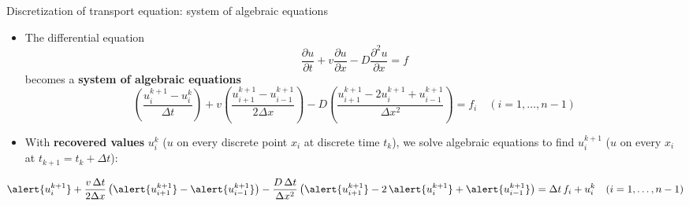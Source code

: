 \begin{frame}{Discretization of transport equation: system of algebraic equations}

\small
\begin{itemize}
\item The differential equation
\[
\frac{\partial u}{\partial t}+v\frac{\partial u}{\partial x}-D\frac{\partial^{2}u}{\partial x}=f
\]
%
\vskip 10pt
becomes a \textbf{system of algebraic equations}
\[
\left(\frac{u_{i}^{k+1}-u_{i}^{k}}{\Delta t}\right)+v\left(\frac{u_{i+1}^{k+1}-u_{i-1}^{k+1}}{2\Delta x}\right)-D\left(\frac{u_{i+1}^{k+1}-2u^{k+1}_{i}+u_{i-1}^{k+1}}{\Delta x^{2}}\right)=f_{i}\quad(i=1,\ldots,n-1)
\]
\item With {\bf recovered values} $u^k_i$ ($u$ on every \alert{discrete point} $x_{i}$ at \alert{discrete time} $t_{k}$), we solve algebraic equations to find \alert{$u^{k+1}_i$} ($u$ on every $x_{i}$ at ${t_{k+1}=t_{k}+\Delta t}$):\\[10pt]
\end{itemize}
%
\[
\alert{u_{i}^{k+1}}
+ \frac{v \, \Delta t}{2\Delta x} \left(\alert{u_{i+1}^{k+1}}-\alert{u_{i-1}^{k+1}}\right)
- \frac{D \, \Delta t}{\Delta x^{2}} \left(\alert{u_{i+1}^{k+1}}-2\,\alert{u^{k+1}_{i}}+\alert{u_{i-1}^{k+1}}\right) 
= \Delta t \, f_{i} + u_{i}^{k} \quad(i=1,\ldots,n-1)
\]


\end{frame}
%
%
